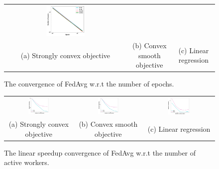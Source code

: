 \begin{figure}
\begin{tabular}{ccc}
	\includegraphics[width=0.33\textwidth]{fig/paper-linregression-newspeedupEpochsRounds-min-linearregressionw8a-epsilon002-reg0.pdf} \\
(a) Strongly convex objective & (b) Convex smooth objective & (c) Linear regression
	\end{tabular}
\caption{The convergence of FedAvg w.r.t the number of epochs. }
\label{fig:e}
\end{figure}

\begin{figure}
\centering
	\begin{tabular}{ccc}
	\hspace{-2em}\includegraphics[width=0.33\textwidth]{fig/paper-partialstronglycvxsmthspeedupNodesT-min-w8a-epsilon0131-reg1e-05.pdf} &
\includegraphics[width=0.33\textwidth]{fig/paper-partialcvxsmoothspeedupNodesT-min-w8a-epsilon0134-reg0.pdf} &
\includegraphics[width=0.33\textwidth]{fig/paper-partiallinregressionspeedupNodesT-min-linearregressionw8a-epsilon002-reg0.pdf}\\
(a) Strongly convex objective & (b) Convex smooth objective & (c) Linear regression
	\end{tabular}
\caption{The linear speedup convergence of FedAvg w.r.t the number of active workers. }
\label{fig:partial}
\end{figure}


